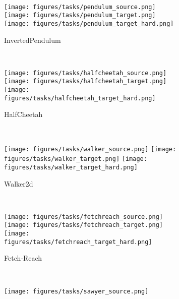 \begin{figure}[t]
    \centering
    \begin{subfigure}[t]{\linewidth}
        \centering
    \end{subfigure}
    \\
    \vspace{0.3em}
    \begin{subfigure}[t]{\linewidth}
        \centering
        \texttt{[image: figures/tasks/pendulum\_source.png]}
        \texttt{[image: figures/tasks/pendulum\_target.png]}
        \texttt{[image: figures/tasks/pendulum\_target\_hard.png]}
        \caption{InvertedPendulum}
    \end{subfigure}
    \\
    \begin{subfigure}[t]{\linewidth}
        \centering
        \texttt{[image: figures/tasks/halfcheetah\_source.png]}
        \texttt{[image: figures/tasks/halfcheetah\_target.png]}
        \texttt{[image: figures/tasks/halfcheetah\_target\_hard.png]}
        \caption{HalfCheetah}
    \end{subfigure}
    \\
    \begin{subfigure}[t]{\linewidth}
        \centering
        \texttt{[image: figures/tasks/walker\_source.png]}
        \texttt{[image: figures/tasks/walker\_target.png]}
        \texttt{[image: figures/tasks/walker\_target\_hard.png]}
        \caption{Walker2d}
    \end{subfigure}
    \\
    \begin{subfigure}[t]{\linewidth}
        \centering
        \texttt{[image: figures/tasks/fetchreach\_source.png]}        
        \texttt{[image: figures/tasks/fetchreach\_target.png]}        
        \texttt{[image: figures/tasks/fetchreach\_target\_hard.png]}
        \caption{Fetch-Reach}
    \end{subfigure}
    \\
    \begin{subfigure}[t]{\linewidth}
        \centering
        \texttt{[image: figures/tasks/sawyer\_source.png]}        

\end{subfigure}
\end{figure}
